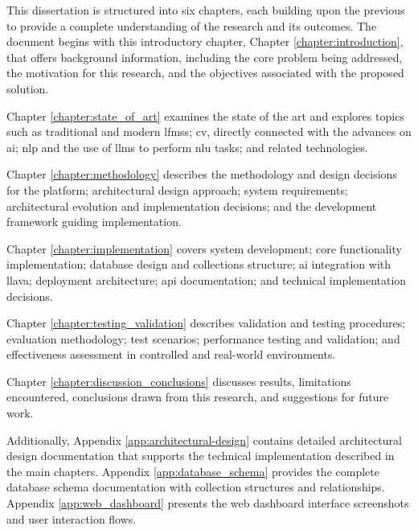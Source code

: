This dissertation is structured into six chapters, each building upon the previous to provide a complete understanding of the research and its outcomes. The document begins with this introductory chapter, Chapter \ref{chapter:introduction}, that offers background information, including the core problem being addressed, the motivation for this research, and the objectives associated with the proposed solution.

Chapter \ref{chapter:state_of_art} examines the state of the art and explores topics such as traditional and modern \acp{lfms}; \ac{cv}, directly connected with the advances on \ac{ai}; \ac{nlp} and the use of \acp{llm} to perform \ac{nlu} tasks; and related technologies.

Chapter \ref{chapter:methodology} describes the methodology and design decisions for the platform; architectural design approach; system requirements; architectural evolution and implementation decisions; and the development framework guiding implementation.

Chapter \ref{chapter:implementation} covers system development; core functionality implementation; database design and collections structure; \ac{ai} integration with \ac{llava}; deployment architecture; \ac{api} documentation; and technical implementation decisions.

Chapter \ref{chapter:testing_validation} describes validation and testing procedures; evaluation methodology; test scenarios; performance testing and validation; and effectiveness assessment in controlled and real-world environments.

Chapter \ref{chapter:discussion_conclusions} discusses results, limitations encountered, conclusions drawn from this research, and suggestions for future work.

Additionally, Appendix \ref{app:architectural-design} contains detailed architectural design documentation that supports the technical implementation described in the main chapters. Appendix \ref{app:database_schema} provides the complete database schema documentation with collection structures and relationships. Appendix \ref{app:web_dashboard} presents the web dashboard interface screenshots and user interaction flows.
